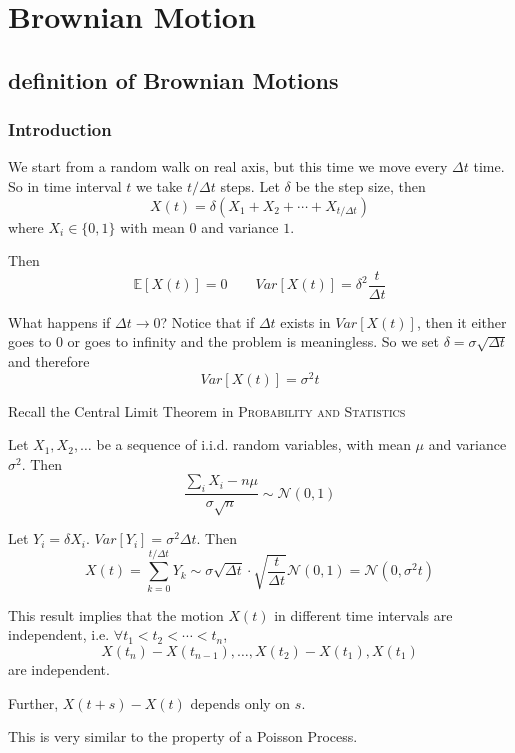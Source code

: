 \chapter{Brownian Motion}

\newpage

\newcommand{\cov}{\mathrm{Cov}}
\newcommand{\var}{\mathrm{Var}}


\section{definition of Brownian Motions}
    \subsection{Introduction}
        We start from a random walk on real axis, but this time we move every $\Delta t$ time. So in time interval $t$ we take $t/\Delta t$ steps. Let $\delta$ be the step size, then
        \[ X(t) = \delta(X_1 + X_2 + \cdots + X_{t/\Delta t}) \]
        where $X_i \in \{0,1\}$ with mean $0$ and variance $1$.

        Then
        \[ \mathbb{E}[X(t)] = 0 \qquad Var[X(t)] = \delta^2\frac{t}{\Delta t} \]

        What happens if $\Delta t \to 0$? Notice that if $\Delta t$ exists in $Var[X(t)]$, then it either goes to 0 or goes to infinity and the problem is meaningless. So we set $\delta = \sigma \sqrt{\Delta t}$ and therefore
        \[ Var[X(t)] = \sigma^2 t \]

        Recall the Central Limit Theorem in \textsc{Probability and Statistics}
        \begin{theorem}\label{thm:CentralLimitTheorem}
            Let $X_1,X_2,\dots$ be a sequence of i.i.d. random variables, with mean $\mu$ and variance $\sigma^2$. Then
            \[ \frac{\sum_iX_i - n\mu}{\sigma\sqrt{n}} \sim \mathcal{N}(0,1) \]
        \end{theorem}

        Let $Y_i = \delta X_i$. $Var[Y_i] = \sigma^2 \Delta t$. Then
        \[ X(t) = \sum_{k=0}^{t/\Delta t} Y_k \sim \sigma \sqrt{\Delta t}\cdot\sqrt{\frac{t}{\Delta t}} \mathcal{N}(0,1) = \mathcal{N}(0, \sigma^2 t) \]
        
        \begin{remark}
            This result implies that the motion $X(t)$ in different time intervals are independent, i.e. $\forall t_1 < t_2 < \cdots < t_n$,
            \[ X(t_n)-X(t_{n-1}), \dots, X(t_2)-X(t_1), X(t_1) \]
            are independent.

            Further, $X(t+s)-X(t)$ depends only on $s$.

            This is very similar to the property of a Poisson Process.
        \end{remark}

